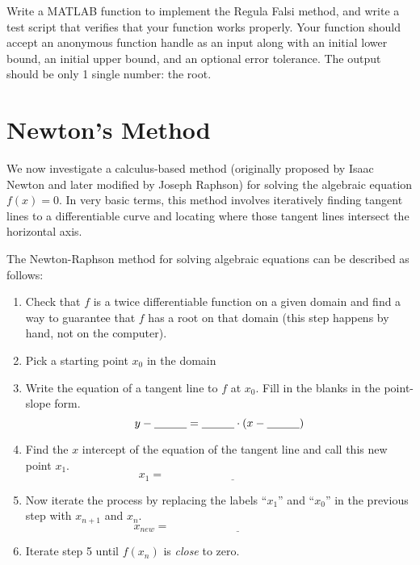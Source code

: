 \begin{problem}
   Write a MATLAB function to implement the Regula Falsi method, and write a test script
   that verifies that your function works properly. Your function should accept an
    anonymous function handle as an input along with an initial lower bound, an initial
    upper bound, and an optional error tolerance. The output should be only 1 single number: the
    root.\\
\end{problem}



\section{Newton's Method}
We now investigate a calculus-based method (originally proposed by Isaac Newton and later
modified by Joseph Raphson) for solving the algebraic equation $f(x)=0$. In very basic
terms, this method involves iteratively finding tangent lines to a differentiable curve
and locating where those tangent lines intersect the horizontal axis.
\begin{algorithm}
    The Newton-Raphson method for solving algebraic equations can be described as follows:
    \begin{enumerate}
        \item Check that $f$ is a twice differentiable function on a given domain and find
            a way to guarantee that $f$ has a root on that domain (this step happens by
            hand, not on the computer).
        \item Pick a starting point $x_0$ in the domain
        \item Write the equation of a tangent line to $f$ at $x_0$.  Fill in the blanks in
            the point-slope form.
            \[ y - \underline{\hspace{0.4in}} = \underline{\hspace{0.4in}} \cdot \left(
                x - \underline{\hspace{0.4in}} \right) \]
            \solution{
                \[ y - f(x_0) = f'(x_0) \left( x-x_0 \right) \]
            }
        \item Find the $x$ intercept of the equation of the tangent line and call this new
            point $x_1$.  
            \[ x_1 = \underline{\hspace{2in}} \]
            \solution{
                \[ x_1 = x_0 - \frac{f(x_0)}{f'(x_0)} \]
            }
        \item Now iterate the process by replacing the labels ``$x_1$'' and ``$x_0$'' in
            the previous step with $x_{n+1}$ and $x_{n}$.
            \[ x_{new} = \underline{\hspace{2in}} \]
            \solution{
                \[ x_{n+1} = x_{n} - \frac{f(x_n)}{f'(x_n)} \]
            }
        \item Iterate step 5 until $f(x_{n})$ is {\it close} to zero.
    \end{enumerate}
\end{algorithm}

